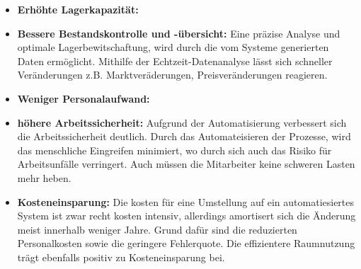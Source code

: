 \begin{itemize}
	\item \textbf{Erhöhte Lagerkapazität:}
	\item \textbf{Bessere Bestandskontrolle und -übersicht:}
	Eine präzise Analyse und optimale Lagerbewitschaftung, wird durch die vom Systeme generierten Daten ermöglicht. Mithilfe der Echtzeit-Datenanalyse lässt sich schneller Veränderungen z.B. Marktveräderungen, Preisveränderungen reagieren. \autocite{Gunasekaran2015}
	\item \textbf{Weniger Personalaufwand:}
	\item \textbf{höhere Arbeitssicherheit:}
	Aufgrund der Automatisierung verbessert sich die Arbeitssicherheit deutlich. Durch das Automateisieren der  Prozesse, wird das menschliche Eingreifen minimiert, wo durch sich auch das Risiko für Arbeitsunfälle verringert. Auch müssen die Mitarbeiter keine schweren Lasten mehr heben. \autocite{kelle2019safety}
	\item \textbf{Kosteneinsparung:}
	Die kosten für eine Umstellung auf ein automatiesiertes System ist zwar recht kosten intensiv, allerdings amortisert sich die Änderung meist innerhalb weniger Jahre. Grund dafür sind die reduzierten Personalkosten sowie die geringere Fehlerquote. Die effizientere Raumnutzung trägt ebenfalls positiv zu Kosteneinsparung bei. \autocite{mueller2023}
	
\end{itemize}